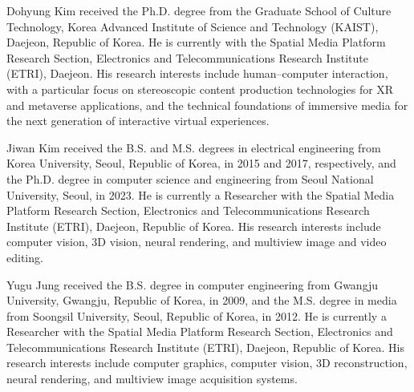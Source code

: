 \documentclass[journal]{IEEEtran}
\begin{document}
\begin{IEEEbiography}{Dohyung Kim}
received the Ph.D. degree from the Graduate School of Culture Technology,
Korea Advanced Institute of Science and Technology (KAIST), Daejeon, Republic
of Korea. He is currently with the Spatial Media Platform Research Section,
Electronics and Telecommunications Research Institute (ETRI), Daejeon. His
research interests include human--computer interaction, with a particular
focus on stereoscopic content production technologies for XR and metaverse
applications, and the technical foundations of immersive media for the next
generation of interactive virtual experiences.
\end{IEEEbiography}

\begin{IEEEbiography}{Jiwan Kim}
received the B.S. and M.S. degrees in electrical engineering from Korea
University, Seoul, Republic of Korea, in 2015 and 2017, respectively, and the
Ph.D. degree in computer science and engineering from Seoul National
University, Seoul, in 2023. He is currently a Researcher with the Spatial
Media Platform Research Section, Electronics and Telecommunications Research
Institute (ETRI), Daejeon, Republic of Korea. His research interests include
computer vision, 3D vision, neural rendering, and multiview image and video
editing.
\end{IEEEbiography}

\begin{IEEEbiography}{Yugu Jung}
received the B.S. degree in computer engineering from Gwangju University,
Gwangju, Republic of Korea, in 2009, and the M.S. degree in media from
Soongsil University, Seoul, Republic of Korea, in 2012. He is currently a
Researcher with the Spatial Media Platform Research Section, Electronics and
Telecommunications Research Institute (ETRI), Daejeon, Republic of Korea. His
research interests include computer graphics, computer vision, 3D
reconstruction, neural rendering, and multiview image acquisition systems.
\end{IEEEbiography}
\end{document}
